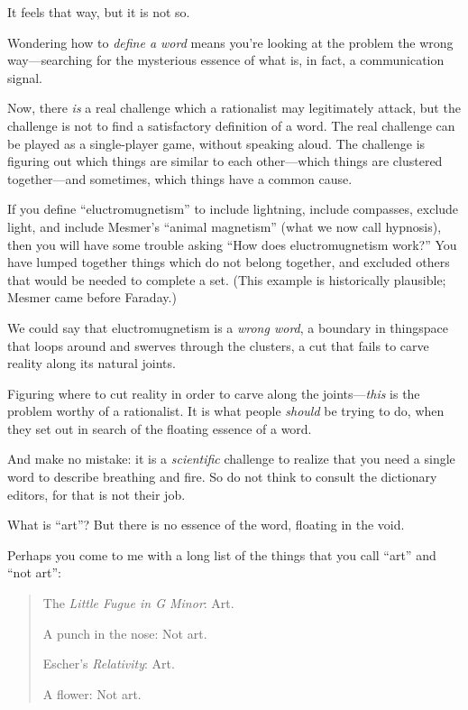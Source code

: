 {{{
 It feels that way, but it is not so.}

{
 Wondering how to \textit{define a word} means
you're looking at the problem the wrong way---searching
for the mysterious essence of what is, in fact, a communication
signal.}

{
 Now, there \textit{is} a real challenge which a rationalist may
legitimately attack, but the challenge is not to find a satisfactory
definition of a word. The real challenge can be played as a
single-player game, without speaking aloud. The challenge is figuring
out which things are similar to each other---which things are clustered
together---and sometimes, which things have a common cause.}

{
 If you define
``eluctromugnetism'' to include
lightning, include compasses, exclude light, and include
Mesmer's ``animal
magnetism'' (what we now call hypnosis), then you
will have some trouble asking ``How does
eluctromugnetism work?'' You have lumped together
things which do not belong together, and excluded others that would be
needed to complete a set. (This example is historically plausible;
Mesmer came before Faraday.)}

{
 We could say that eluctromugnetism is a \textit{wrong word}, a
boundary in thingspace that loops around and swerves through the
clusters, a cut that fails to carve reality along its natural joints.}

{
 Figuring where to cut reality in order to carve along the
joints---\textit{this} is the problem worthy of a rationalist. It is
what people \textit{should} be trying to do, when they set out in
search of the floating essence of a word.}

{
 And make no mistake: it is a \textit{scientific} challenge to
realize that you need a single word to describe breathing and fire. So
do not think to consult the dictionary editors, for that is not their
job.}

{
 What is ``art''? But there is
no essence of the word, floating in the void.}

{
 Perhaps you come to me with a long list of the things that you
call ``art'' and
``not art'':}

\begin{quote}
{
 The \textit{Little Fugue in G Minor}: Art.}

{
 A punch in the nose: Not art.}

{
 Escher's \textit{Relativity}: Art.}

{
 A flower: Not art.}


\end{quote}}}
